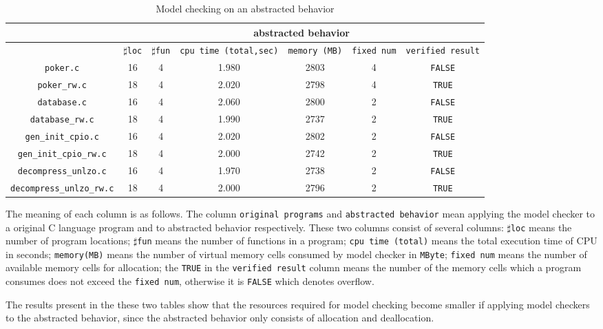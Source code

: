\begin{table}
  \scriptsize
\begin{tabular}{|c|c|c|c|c|c|c|}
\hline
&\multicolumn{6}{|c|}{abstracted behavior} \\
\hline
 &$\sharp$\texttt{loc} & $\sharp$\texttt{fun} & \texttt{cpu time (total,sec)} & \texttt{memory (MB)} & \texttt{fixed num} & \texttt{verified result} \\
\hline
\texttt{poker.c} & 16 & 4 & 1.980 & 2803 & 4  & \texttt{FALSE}  \\
\hline
\texttt{poker\_rw.c} & 18 & 4 & 2.020 & 2798 & 4  & \texttt{TRUE}  \\
\hline
\texttt{database.c} &  16 & 4 & 2.060 & 2800 & 2 & \texttt{FALSE} \\
\hline
\texttt{database\_rw.c} &  18 & 4 & 1.990 & 2737 & 2 & \texttt{TRUE} \\
\hline
\texttt{gen\_init\_cpio.c} & 16 & 4 & 2.020 & 2802 & 2  & \texttt{FALSE}  \\
\hline
\texttt{gen\_init\_cpio\_rw.c} & 18 & 4 & 2.000  & 2742  & 2  & \texttt{TRUE}  \\
\hline
\texttt{decompress\_unlzo.c} & 16 & 4 & 1.970  & 2738  & 2  & \texttt{FALSE}  \\
\hline
\texttt{decompress\_unlzo\_rw.c} & 18 & 4  & 2.000  & 2796  & 2  & \texttt{TRUE}  \\

\hline
\end{tabular}
\caption{Model checking on an abstracted behavior}
\label{tb:mca}
\end{table}

The meaning of each column is as follows.  The column \texttt{original
  programs} and \texttt{abstracted behavior} mean applying the model
checker to a original C language program and to abstracted behavior
respectively.  These two columns consist of several columns:
$\sharp$\texttt{loc} means the number of program locations;
$\sharp$\texttt{fun} means the number of functions in a program;
\texttt{cpu time (total)} means the total execution time of CPU in
seconds; \texttt{memory(MB)} means the number of virtual memory cells
consumed by model checker in \texttt{MByte}; \texttt{fixed num} means
the number of available memory cells for allocation; the \texttt{TRUE}
in the \texttt{verified result} column means the number of the memory
cells which a program consumes does not exceed the \texttt{fixed num},
otherwise it is \texttt{FALSE} which denotes overflow.

The results present in the these two tables show that the
resources required for model checking become smaller if applying model
checkers to the abstracted behavior, since the abstracted behavior
only consists of allocation and deallocation.

